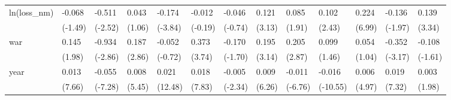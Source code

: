 \begin{tabular}{p{1.5cm} p{1.7cm} p{1.7cm} p{1.7cm} p{1.7cm} p{1.7cm} p{1.7cm} p{1.7cm} p{1.7cm} p{1.7cm} p{1.7cm} p{1.7cm} p{1.7cm}}
\hline
ln(loss\_nm)     &   -0.068         &   -0.511\sym{*}  &    0.043         &   -0.174\sym{***}&   -0.012         &   -0.046         &    0.121\sym{**} &    0.085         &    0.102\sym{*}  &    0.224\sym{***}&   -0.136         &    0.139\sym{**} \\
                &  (-1.49)         &  (-2.52)         &   (1.06)         &  (-3.84)         &  (-0.19)         &  (-0.74)         &   (3.13)         &   (1.91)         &   (2.43)         &   (6.99)         &  (-1.97)         &   (3.34)         \\
war             &    0.145         &   -0.934\sym{**} &    0.187\sym{**} &   -0.052         &    0.373\sym{***}&   -0.170         &    0.195\sym{**} &    0.205\sym{**} &    0.099         &    0.054         &   -0.352\sym{**} &   -0.108         \\
                &   (1.98)         &  (-2.86)         &   (2.86)         &  (-0.72)         &   (3.74)         &  (-1.70)         &   (3.14)         &   (2.87)         &   (1.46)         &   (1.04)         &  (-3.17)         &  (-1.61)         \\
year            &    0.013\sym{***}&   -0.055\sym{***}&    0.008\sym{***}&    0.021\sym{***}&    0.018\sym{***}&   -0.005\sym{*}  &    0.009\sym{***}&   -0.011\sym{***}&   -0.016\sym{***}&    0.006\sym{***}&    0.019\sym{***}&    0.003         \\
                &   (7.66)         &  (-7.28)         &   (5.45)         &  (12.48)         &   (7.83)         &  (-2.34)         &   (6.26)         &  (-6.76)         & (-10.55)         &   (4.97)         &   (7.32)         &   (1.98)         \\
\end{tabular}
